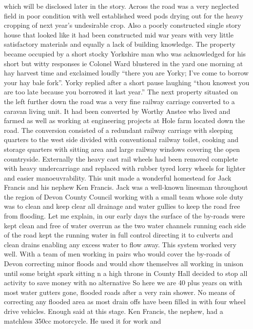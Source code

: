 which will be disclosed later in the story. Across the road was a very
neglected field in poor condition with well established weed pods drying out
for the heavy cropping of next year’s undesirable crop. Also a poorly
constructed single story house that looked like it had been constructed mid war
years with very little satisfactory materials and equally a lack of building
knowledge. The property became occupied by a short stocky Yorkshire man who was
acknowledged for his short but witty responses ie  Colonel Ward blustered in
the yard one morning at hay harvest time and exclaimed loudly ``there you are
Yorky; I’ve come to borrow your hay bale fork''. Yorky replied after a short
pause laughing ``thou knowest you are too late because you borrowed it last
year.''  The next property situated on the left further down the road was a
very fine railway carriage converted to a caravan living unit. It had been
converted by Worthy Anstee who lived and farmed as well as working at
engineering projects at Hole farm located down the road. The conversion
consisted of a redundant railway carriage with sleeping quarters to the west
side divided with conventional railway toilet, cooking and storage quarters
with sitting area and large railway windows covering the open countryside.
Externally the heavy cast rail wheels had been removed complete with heavy
undercarriage and replaced with rubber tyred lorry wheels for lighter and
easier manoeuvrability. This unit made a wonderful homestead for Jack Francis
and his nephew Ken Francis. Jack was a well-known linesman throughout the
region of Devon County Council working with a small team whose sole duty was to
clean and keep clear all drainage and water gullies to keep the road free from
flooding. Let me explain, in our early days the surface of the by-roads were
kept clean and free of water overrun as the two water channels running each
side of the road kept the running water in full control directing it to
culverts  and clean drains enabling any excess water to flow away. This system
worked very well. With a team of men working in pairs who would cover the
by-roads of Devon correcting minor floods and would show themselves all working
in unison until some bright spark sitting n a high throne in County Hall
decided to stop all activity to save money with no alternative  So here we are
40 plus years on with most water gutters gone, flooded roads after a very rain
shower. No means of correcting any flooded area as most drain offs have been
filled in with four wheel drive vehicles. Enough said at this stage. Ken
Francis, the nephew, had a matchless 350cc motorcycle. He used it for work and
